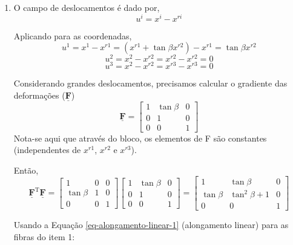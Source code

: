 	\begin{enumerate}
		\item 

		O campo de deslocamentos é dado por,
		\[u^i=x^i-x^{ri}\]
	
		Aplicando para as coordenadas,
		\[u^1=x^1-x^{r1}=(x^{r1}+\tan\beta x^{r2})-x^{r1}=\tan\beta x^{r2}\]
		\[u^2=x^2-x^{r2}=x^{r2}-x^{r2}=0\]
		\[u^3=x^2-x^{r2}=x^{r3}-x^{r3}=0\]
	
		Considerando grandes deslocamentos, precisamos calcular o gradiente das deformações ($\underline{\mathbf{F}}$)
		\[
			\underline{\mathbf{F}}
			=
			\begin{bmatrix}
				1 & \tan\beta & 0 \\
				0 & 1 & 0 \\
				0 & 0 & 1
			\end{bmatrix}			
		\]
		Nota-se aqui que através do bloco, os elementos de F são constantes (independentes de $x^{r1}$, $x^{r2}$ e $x^{r3}$).
	
		Então,
		\[
			\underline{\mathbf{F}}^{\text{T}}\underline{\mathbf{F}}
			=
			\begin{bmatrix}
				1 & 0 & 0 \\
				\tan\beta & 1 & 0 \\
				0 & 0 & 1
			\end{bmatrix}
			\begin{bmatrix}
				1 & \tan\beta & 0 \\
				0 & 1 & 0 \\
				0 & 0 & 1
			\end{bmatrix}
			=
			\begin{bmatrix}
				1 & \tan\beta & 0 \\
				\tan\beta & \tan^2\beta + 1 & 0 \\
				0 & 0 & 1
			\end{bmatrix}
		\]
	
		Usando a Equação \eqref{eq-alongamento-linear-1} (alongamento linear) para as fibras do item 1:
	

\end{enumerate}
